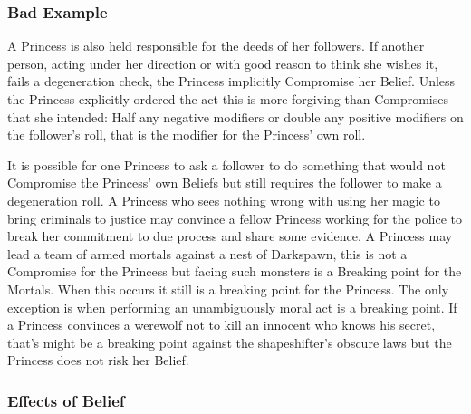 \subsubsection*{Bad Example}

A Princess is also held responsible for the deeds of her followers. If another person, acting under her direction or with good reason to think she wishes it, fails a degeneration check, the Princess implicitly Compromise her Belief. Unless the Princess explicitly ordered the act this is more forgiving than Compromises that she intended: Half any negative modifiers or double any positive modifiers on the follower's roll, that is the modifier for the Princess' own roll. 

It is possible for one Princess to ask a follower to do something that would not Compromise the Princess' own Beliefs but still requires the follower to make a degeneration roll. A Princess who sees nothing wrong with using her magic to bring criminals to justice may convince a fellow Princess working for the police to break her commitment to due process and share some evidence. A Princess may lead a team of armed mortals against a nest of Darkspawn, this is not a Compromise for the Princess but facing such monsters is a Breaking point for the Mortals. When this occurs it still is a breaking point for the Princess. The only exception is when performing an unambiguously moral act is a breaking point. If a Princess convinces a werewolf not to kill an innocent who knows his secret, that's might be a breaking point against the shapeshifter's obscure laws but the Princess does not risk her Belief.

\subsubsection*{Effects of Belief}


